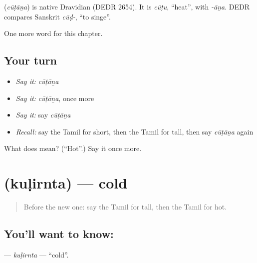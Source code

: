\begin{cousinweb}
\textbf{} (\emph{cūṭāṉa}) is native Dravidian (DEDR 2654). It is \emph{cūṭu}, \textquotedblleft{}heat\textquotedblright{}, with \emph{-āṉa}. DEDR compares Sanskrit \emph{cūḍ-}, \textquotedblleft{}to singe\textquotedblright{}.
\end{cousinweb}

\begin{grammarlens}[title={What you've built}]
One more word for this chapter.
\end{grammarlens}

\subsection*{Your turn}
\begin{itemize}
\raggedright
  \item \emph{Say it:} \emph{cūṭāṉa}
  \item \emph{Say it:} \emph{cūṭāṉa}, once more
  \item \emph{Say it:} say \emph{cūṭāṉa}
  \item \emph{Recall:} say the Tamil for short, then the Tamil for tall, then say \emph{cūṭāṉa} again
\end{itemize}

\begin{tcolorbox}[breakable,colback=teal!4,colframe=teal!35!black,title={Before you move on}]
What does  mean? (\textquotedblleft{}Hot\textquotedblright{}.) Say it once more.
\end{tcolorbox}
\section[\texorpdfstring{\ta{குளிர்ந்த} (kuḷirnta)}{குளிர்ந்த (kuḷirnta)}]{ (kuḷirnta) — cold}

\label{lesson:TA-C144-kulirnta}



\begin{quote}
Before the new one: say the Tamil for tall, then the Tamil for hot.
\end{quote}

\subsection*{You'll want to know: }
\textbf{} — \emph{kuḷirnta} — \textquotedblleft{}cold\textquotedblright{}.

